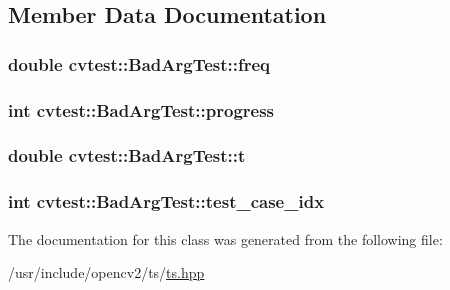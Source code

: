 \subsection{Member Data Documentation}
\hypertarget{classcvtest_1_1BadArgTest_a3f035cc70650375c27bb539e045a90c9}{
\subsubsection[{freq}]{\setlength{\rightskip}{0pt plus 5cm}double cvtest\-::\-Bad\-Arg\-Test\-::freq\hspace{0.3cm}{\ttfamily [protected]}}}\label{classcvtest_1_1BadArgTest_a3f035cc70650375c27bb539e045a90c9}
\hypertarget{classcvtest_1_1BadArgTest_a0aeca69cbbb9e72ead59070cf7c311b5}{
\subsubsection[{progress}]{\setlength{\rightskip}{0pt plus 5cm}int cvtest\-::\-Bad\-Arg\-Test\-::progress\hspace{0.3cm}{\ttfamily [protected]}}}\label{classcvtest_1_1BadArgTest_a0aeca69cbbb9e72ead59070cf7c311b5}
\hypertarget{classcvtest_1_1BadArgTest_a510e014faa20b65043d782db0dd8a480}{
\subsubsection[{t}]{\setlength{\rightskip}{0pt plus 5cm}double cvtest\-::\-Bad\-Arg\-Test\-::t\hspace{0.3cm}{\ttfamily [protected]}}}\label{classcvtest_1_1BadArgTest_a510e014faa20b65043d782db0dd8a480}
\hypertarget{classcvtest_1_1BadArgTest_a399003e045f8d36d6e5d7d6be08d9798}{
\subsubsection[{test\-\_\-case\-\_\-idx}]{\setlength{\rightskip}{0pt plus 5cm}int cvtest\-::\-Bad\-Arg\-Test\-::test\-\_\-case\-\_\-idx\hspace{0.3cm}{\ttfamily [protected]}}}\label{classcvtest_1_1BadArgTest_a399003e045f8d36d6e5d7d6be08d9798}


The documentation for this class was generated from the following file\-:\begin{DoxyCompactItemize}
\item 
/usr/include/opencv2/ts/\hyperlink{ts_8hpp}{ts.\-hpp}\end{DoxyCompactItemize}
